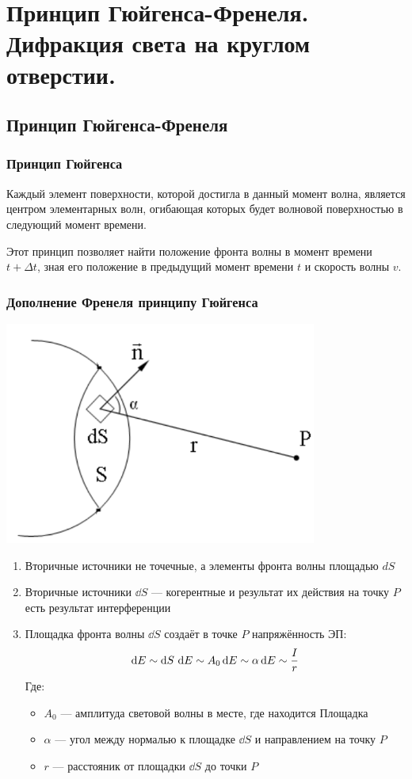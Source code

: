 \documentclass[12pt]{report}
\begin{document}
\section{Принцип Гюйгенса-Френеля. Дифракция света на круглом отверстии.}
\subsection{Принцип Гюйгенса-Френеля}
\subsubsection{Принцип Гюйгенса}
Каждый элемент поверхности, которой достигла в данный момент волна, является центром элементарных волн, огибающая которых будет волновой поверхностью в следующий момент времени.

Этот принцип позволяет найти положение фронта волны в момент времени $t + \Delta t$, зная его положение в предыдущий момент времени $t$ и скорость волны $v$.

\subsubsection{Дополнение Френеля принципу Гюйгенса}
\includegraphics{graphics/05_1.png}
\begin{enumerate}
    \item Вторичные источники не точечные, а элементы фронта волны площадью $dS$
    \item Вторичные источники $\dd S$ --- когерентные и результат их действия на точку $P$ есть результат интерференции
    \item Площадка фронта волны $\dd S$ создаёт в точке $P$ напряжённость ЭП:
          \[
              \dd{E} \sim \dd{S} \\ \dd{E} \sim A_0 \\ \dd{E} \sim \alpha \\ \dd{E} \sim \dfrac{I}{r}
          \]
          Где:
          \begin{itemize}
              \item $A_0$ --- амплитуда световой волны в месте, где находится Площадка
              \item $\alpha$ --- угол между нормалью к площадке $\dd{S}$ и направлением на точку $P$
              \item $r$ --- расстояник от площадки $\dd S$ до точки $P$
          \end{itemize}
\end{enumerate}
\end{document}
